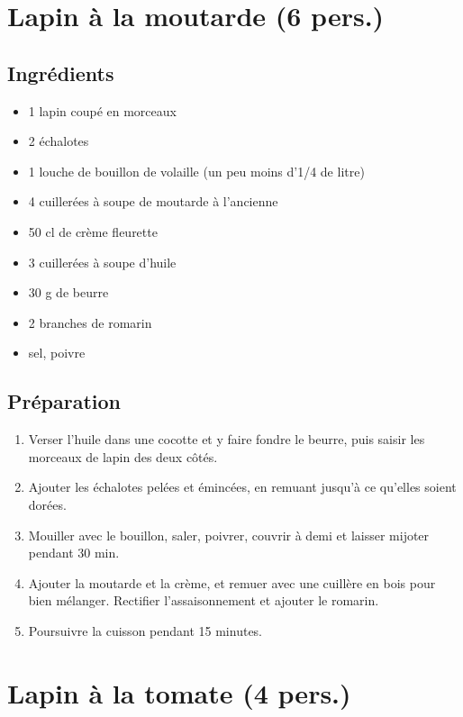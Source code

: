 \newpage
\section{Lapin à la moutarde (6 pers.)}
\subsection*{Ingrédients}
\begin{itemize}
\item 1 lapin coupé en morceaux
\item 2 échalotes
\item 1 louche de bouillon de volaille (un peu moins d'1/4 de litre)
\item 4 cuillerées à soupe de moutarde à l'ancienne
\item 50 cl de crème fleurette
\item 3 cuillerées à soupe d'huile
\item 30 g de beurre
\item 2 branches de romarin
\item sel, poivre
\end{itemize}

\subsection*{Préparation}
\begin{enumerate}
\item Verser l'huile dans une cocotte et y faire fondre le beurre, puis saisir les morceaux de lapin des deux côtés.
\item Ajouter les échalotes pelées et émincées, en remuant jusqu'à ce qu'elles soient dorées.
\item Mouiller avec le bouillon, saler, poivrer, couvrir à demi et laisser mijoter pendant 30 min.
\item Ajouter la moutarde et la crème, et remuer avec une cuillère en bois pour bien mélanger. Rectifier l'assaisonnement et ajouter le romarin.
\item Poursuivre la cuisson pendant 15 minutes.
\end{enumerate}


\newpage
\section{Lapin à la tomate (4 pers.)}
